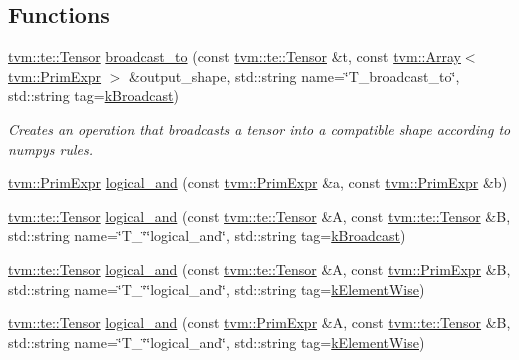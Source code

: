 \subsection*{Functions}
\begin{DoxyCompactItemize}
\item 
\hyperlink{classtvm_1_1te_1_1Tensor}{tvm\+::te\+::\+Tensor} \hyperlink{namespacetopi_abab02d4352666a313c80a1cf73bdec26}{broadcast\+\_\+to} (const \hyperlink{classtvm_1_1te_1_1Tensor}{tvm\+::te\+::\+Tensor} \&t, const \hyperlink{classtvm_1_1Array}{tvm\+::\+Array}$<$ \hyperlink{classtvm_1_1PrimExpr}{tvm\+::\+Prim\+Expr} $>$ \&output\+\_\+shape, std\+::string name=\char`\"{}T\+\_\+broadcast\+\_\+to\char`\"{}, std\+::string tag=\hyperlink{namespacetopi_a794b9155e9ba9d1c9c42a1cff1fb645f}{k\+Broadcast})
\begin{DoxyCompactList}\small\item\em Creates an operation that broadcasts a tensor into a compatible shape according to numpy\textquotesingle{}s rules. \end{DoxyCompactList}\item 
\hyperlink{classtvm_1_1PrimExpr}{tvm\+::\+Prim\+Expr} \hyperlink{namespacetopi_a663f04b71464b8bb32a9498a71733200}{logical\+\_\+and} (const \hyperlink{classtvm_1_1PrimExpr}{tvm\+::\+Prim\+Expr} \&a, const \hyperlink{classtvm_1_1PrimExpr}{tvm\+::\+Prim\+Expr} \&b)
\item 
\hyperlink{classtvm_1_1te_1_1Tensor}{tvm\+::te\+::\+Tensor} \hyperlink{namespacetopi_a941e2e9f9494ab3e52017c3e1ea8b257}{logical\+\_\+and} (const \hyperlink{classtvm_1_1te_1_1Tensor}{tvm\+::te\+::\+Tensor} \&A, const \hyperlink{classtvm_1_1te_1_1Tensor}{tvm\+::te\+::\+Tensor} \&B, std\+::string name=\char`\"{}T\+\_\+\char`\"{}\char`\"{}logical\+\_\+and\char`\"{}, std\+::string tag=\hyperlink{namespacetopi_a794b9155e9ba9d1c9c42a1cff1fb645f}{k\+Broadcast})
\item 
\hyperlink{classtvm_1_1te_1_1Tensor}{tvm\+::te\+::\+Tensor} \hyperlink{namespacetopi_a587cfeafa2eafa93be14e246779054fe}{logical\+\_\+and} (const \hyperlink{classtvm_1_1te_1_1Tensor}{tvm\+::te\+::\+Tensor} \&A, const \hyperlink{classtvm_1_1PrimExpr}{tvm\+::\+Prim\+Expr} \&B, std\+::string name=\char`\"{}T\+\_\+\char`\"{}\char`\"{}logical\+\_\+and\char`\"{}, std\+::string tag=\hyperlink{namespacetopi_ac1b34ed59d38a5f5338bee6b2cad42be}{k\+Element\+Wise})
\item 
\hyperlink{classtvm_1_1te_1_1Tensor}{tvm\+::te\+::\+Tensor} \hyperlink{namespacetopi_abfd4456eb091b8150cd8e324b276e8b2}{logical\+\_\+and} (const \hyperlink{classtvm_1_1PrimExpr}{tvm\+::\+Prim\+Expr} \&A, const \hyperlink{classtvm_1_1te_1_1Tensor}{tvm\+::te\+::\+Tensor} \&B, std\+::string name=\char`\"{}T\+\_\+\char`\"{}\char`\"{}logical\+\_\+and\char`\"{}, std\+::string tag=\hyperlink{namespacetopi_ac1b34ed59d38a5f5338bee6b2cad42be}{k\+Element\+Wise})

\end{DoxyCompactItemize}

